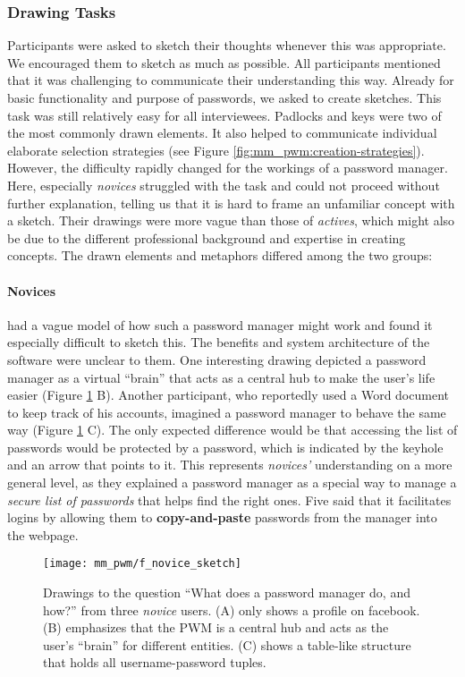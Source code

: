 \subsubsection{Drawing Tasks}
Participants were asked to sketch their thoughts whenever this was appropriate. We encouraged them to sketch as much as possible. All participants mentioned that it was challenging to communicate their understanding this way. Already for basic functionality and purpose of passwords, we asked to create sketches. This task was still relatively easy for all interviewees. Padlocks and keys were two of the most commonly drawn elements. It also helped to communicate individual elaborate selection strategies (see Figure \ref{fig:mm_pwm:creation-strategies}). However, the difficulty rapidly changed for the workings of a password manager.
Here, especially \textit{novices} struggled with the task and could not proceed without further explanation, telling us that it is hard to frame an unfamiliar concept with a sketch. Their drawings were more vague than those of \textit{actives}, which might also be due to the different professional background and expertise in creating concepts. The drawn elements and metaphors differed among the two groups: 
\paragraph{Novices} had a vague model of how such a password manager might work and found it especially difficult to sketch this. The benefits and system architecture of the software were unclear to them. One interesting drawing depicted a password manager as a virtual ``brain'' that acts as a central hub to make the user's life easier (Figure \ref{fig:mm_pwm:f_novice_sketch} B). Another participant, who reportedly used a Word document to keep track of his accounts, imagined a password manager to behave the same way (Figure \ref{fig:mm_pwm:f_novice_sketch} C). The only expected difference would be that accessing the list of passwords would be protected by a password, which is indicated by the keyhole and an arrow that points to it. This represents \textit{novices'} understanding on a more general level, as they explained a password manager as a special way to manage a \textit{secure list of passwords} that helps find the right ones. Five said that it facilitates logins by allowing them to \textbf{copy-and-paste} passwords from the manager into the webpage. 
\begin{figure}
	\centering
	\texttt{[image: mm\_pwm/f\_novice\_sketch]}
	\caption{\label{fig:mm_pwm:f_novice_sketch}	Drawings to the question ``What does a password manager do, and how?'' from three \textit{novice} users. (A) only shows a profile on facebook. (B) emphasizes that the PWM is a central hub and acts as the user's ``brain'' for different entities. (C) shows a table-like structure that holds all username-password tuples.}
\end{figure}

